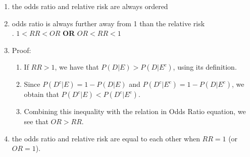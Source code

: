 \begin{enumerate}
    \item the odds ratio and relative risk are always ordered
    \hfill \cite{statistics/book/Statistics-for-Data-Scientists/Maurits-Kaptein}

    \item odds ratio is always further away from 1 than the relative risk
    \hfill \cite{statistics/book/Statistics-for-Data-Scientists/Maurits-Kaptein}
    \\
    .\hfill 
    $1 < RR < OR$ 
    \hfill \textbf{OR} \hfill 
    $OR < RR < 1$
    \hfill \cite{statistics/book/Statistics-for-Data-Scientists/Maurits-Kaptein}

    \item Proof: 
    \begin{enumerate}
        \item  If $RR > 1$, we have that $P(D|E) > P(D|E^c)$, using its definition. 
        \hfill \cite{statistics/book/Statistics-for-Data-Scientists/Maurits-Kaptein}

        \item Since $P(D^c|E) = 1 - P(D|E)$ and $P(D^c|E^c) = 1 - P(D|E^c)$, we obtain that $P(D^c|E) < P(D^c|E^c)$.
        \hfill \cite{statistics/book/Statistics-for-Data-Scientists/Maurits-Kaptein}

        \item Combining this inequality with the relation in Odds Ratio equation, we see that $OR > RR$.
        \hfill \cite{statistics/book/Statistics-for-Data-Scientists/Maurits-Kaptein}

    \end{enumerate}

    \item the odds ratio and relative risk are equal to each other when $RR = 1$ (or $OR = 1$).
    \hfill \cite{statistics/book/Statistics-for-Data-Scientists/Maurits-Kaptein}
\end{enumerate}

















